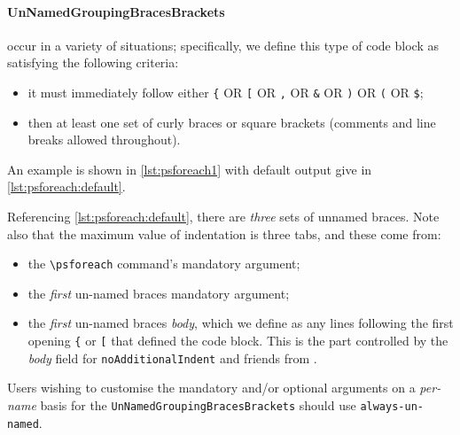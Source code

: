 	\paragraph{UnNamedGroupingBracesBrackets} occur in a variety of situations; specifically, we define
		this type of code block as satisfying the following criteria:
		\begin{itemize}
			\item it must immediately follow either \lstinline!{! OR \lstinline![! OR
			      \lstinline!,! OR \lstinline!&! OR \lstinline!)! OR
			      \lstinline!(! OR \lstinline!$!;
			\item then at least one set of curly braces or square brackets (comments and line breaks
			      allowed throughout).
		\end{itemize}

		An example is shown in \cref{lst:psforeach1} with default output give in
		\cref{lst:psforeach:default}.

		\begin{minipage}{.45\textwidth}
		\end{minipage}%
		\hfill
		\begin{minipage}{.5\textwidth}
		\end{minipage}%

		Referencing \cref{lst:psforeach:default}, there are \emph{three} sets of unnamed
		braces. Note also that the maximum value of indentation is three tabs, and these come
		from:
		\begin{itemize}
			\item the \lstinline!\psforeach! command's mandatory argument;
			\item the \emph{first} un-named braces mandatory argument;
			\item the \emph{first} un-named braces \emph{body}, which we define as any
			      lines following the first opening \lstinline!{! or \lstinline![! that
			      defined the code block.  This is the part controlled by the \emph{body} field
			      for \texttt{noAdditionalIndent} and friends from .
		\end{itemize}
		Users wishing to customise the mandatory and/or optional arguments on a
		\emph{per-name} basis for the \texttt{UnNamedGroupingBracesBrackets} should use
		\texttt{always-un-named}.

